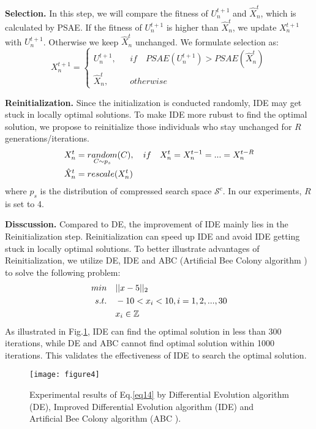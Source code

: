 \documentclass[final]{cvpr}
\begin{document}
\textbf{Selection.} In this step, we will compare the fitness of $U_{n}^{t+1}$ and $\hat{X}_{n}^t$, which is calculated by PSAE. 
If the fitness of $U_{n}^{t+1}$ is higher than $\hat{X}_{n}^t$, we update $X_{n}^{t+1}$ with $U_{n}^{t+1}$. Otherwise we keep 
$\hat{X}_{n}^t$ unchanged. We formulate selection as:
\begin{equation}
    X_{n}^{t+1} = \left\{  
        \begin{array}{rcl}  
        U_{n}^{t+1},& & if \quad PSAE(U_n^{t+1}) > PSAE(\hat{X}_n^t) \\
        \hat{X}_{n}^t,&  & otherwise
    \end{array}  
\right.  \label{eq12}
\end{equation}


\textbf{Reinitialization.} Since the initialization is conducted randomly, IDE may get stuck in locally optimal solutions. To make 
IDE more rubust to find the optimal solution, we propose to reinitialize those individuals who stay unchanged for 
$R$ generations/iterations. 
\begin{align}
    X_n^t &= \mathop{random} \limits_{C\sim p_{s}}(C), \quad if\quad X_n^t = X_n^{t-1} = ... = X_n^{t-R} \notag \\
    \hat{X}_n^t &= rescale(X_n^t) \label{eq13}
\end{align} 
\noindent where $p_{s}$ is the distribution of compressed search space $\mathcal{S}^c$. In our experiments, $R$ is set to 4. 

\textbf{Disscussion.} Compared to DE, the improvement of IDE mainly lies in the Reinitialization step. Reinitialization
can speed up IDE and avoid IDE getting stuck in locally optimal solutions. To better illustrate advantages of Reinitialization, 
we utilize DE, IDE and ABC (Artificial Bee Colony algorithm \cite{lin2020channel}) to solve the following problem:
\begin{align}
    min \quad &||x-5||_2 \notag\\
    s.t. \quad &-10< x_i < 10, i=1,2,...,30 \notag\\
    &x_i \in \mathbb{Z}
    \label{eq14}
\end{align}
As illustrated in Fig.\ref{fig3}, IDE can find the optimal solution in less than 300 iterations, while DE and ABC cannot 
find optimal solution within 1000 iterations. This validates the effectiveness of IDE to search the optimal solution.

\begin{figure}[t]
    \centering
    \texttt{[image: figure4]} %
    \caption{
        Experimental results of Eq.\ref{eq14} by Differential Evolution algorithm (DE), Improved Differential Evolution algorithm (IDE) and Artificial
        Bee Colony algorithm (ABC \cite{lin2020channel}).
    }
    \label{fig3}
\end{figure}
\end{document}
